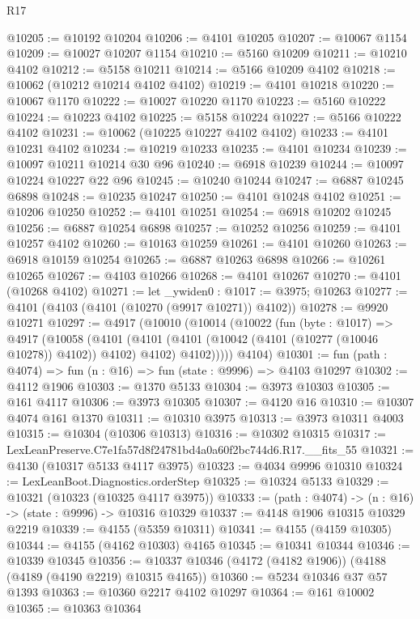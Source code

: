 \begin{lexlean}{R17}
\begin{coremodule}
@10205 := @10192 @10204
@10206 := @4101 @10205
@10207 := @10067 @1154
@10209 := @10027 @10207 @1154
@10210 := @5160 @10209
@10211 := @10210 @4102
@10212 := @5158 @10211
@10214 := @5166 @10209 @4102
@10218 := @10062 (@10212 @10214 @4102 @4102)
@10219 := @4101 @10218
@10220 := @10067 @1170
@10222 := @10027 @10220 @1170
@10223 := @5160 @10222
@10224 := @10223 @4102
@10225 := @5158 @10224
@10227 := @5166 @10222 @4102
@10231 := @10062 (@10225 @10227 @4102 @4102)
@10233 := @4101 @10231 @4102
@10234 := @10219 @10233
@10235 := @4101 @10234
@10239 := @10097 @10211 @10214 @30 @96
@10240 := @6918 @10239
@10244 := @10097 @10224 @10227 @22 @96
@10245 := @10240 @10244
@10247 := @6887 @10245 @6898
@10248 := @10235 @10247
@10250 := @4101 @10248 @4102
@10251 := @10206 @10250
@10252 := @4101 @10251
@10254 := @6918 @10202 @10245
@10256 := @6887 @10254 @6898
@10257 := @10252 @10256
@10259 := @4101 @10257 @4102
@10260 := @10163 @10259
@10261 := @4101 @10260
@10263 := @6918 @10159 @10254
@10265 := @6887 @10263 @6898
@10266 := @10261 @10265
@10267 := @4103 @10266
@10268 := @4101 @10267
@10270 := @4101 (@10268 @4102)
@10271 := let _ywiden0 : @1017 := @3975; @10263
@10277 := @4101 (@4103 (@4101 (@10270 (@9917 @10271)) @4102))
@10278 := @9920 @10271
@10297 := @4917
    (@10010
      (@10014
        (@10022
          (fun (byte : @1017) =>
          @4917
            (@10058
              (@4101
                (@4101 (@4101 (@10042 (@4101 (@10277 (@10046 @10278)) @4102)) @4102) @4102)
                @4102)))))
      @4104)
@10301 := fun (path : @4074) => fun (n : @16) => fun (state : @9996) => @4103 @10297
@10302 := @4112 @1906
@10303 := @1370 @5133
@10304 := @3973 @10303
@10305 := @161 @4117
@10306 := @3973 @10305
@10307 := @4120 @16
@10310 := @10307 @4074 @161 @1370
@10311 := @10310 @3975
@10313 := @3973 @10311 @4003
@10315 := @10304 (@10306 @10313)
@10316 := @10302 @10315
@10317 := LexLeanPreserve.C7e1fa57d8f24781bd4a0a60f2bc744d6.R17.__fits_55
@10321 := @4130 (@10317 @5133 @4117 @3975)
@10323 := @4034 @9996 @10310
@10324 := LexLeanBoot.Diagnostics.orderStep
@10325 := @10324 @5133
@10329 := @10321 (@10323 (@10325 @4117 @3975))
@10333 := (path : @4074) -> (n : @16) -> (state : @9996) -> @10316 @10329
@10337 := @4148 @1906 @10315 @10329 @2219
@10339 := @4155 (@5359 @10311)
@10341 := @4155 (@4159 @10305)
@10344 := @4155 (@4162 @10303) @4165
@10345 := @10341 @10344
@10346 := @10339 @10345
@10356 := @10337 @10346 (@4172 (@4182 @1906)) (@4188 (@4189 (@4190 @2219) @10315 @4165))
@10360 := @5234 @10346 @37 @57 @1393
@10363 := @10360 @2217 @4102 @10297
@10364 := @161 @10002
@10365 := @10363 @10364

\end{coremodule}
\end{lexlean}
